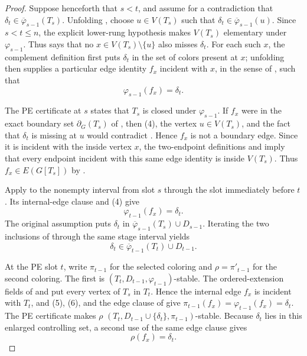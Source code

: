 \begin{proof}
Suppose henceforth that \(s<t\), and assume for a contradiction that
\(\delta_t\in\overline\varphi_{s-1}(T_s)\).  Unfolding
, choose \(u\in V(T_s)\) such that
\(\delta_t\in\overline\varphi_{s-1}(u)\).  Since \(s<t\leq n\), the
explicit lower-rung hypothesis makes \(V(T_s)\) elementary under
\(\varphi_{s-1}\).  Thus  says that
no \(x\in V(T_s)\setminus\{u\}\) also misses \(\delta_t\).  For each
such \(x\), the complement definition  first puts
\(\delta_t\) in the set of colors present at \(x\); unfolding
 then supplies a particular edge identity \(f_x\)
incident with \(x\), in the sense of , such that
\[
                        \varphi_{s-1}(f_x)=\delta_t.             \tag{4}
\]

The PE certificate at \(s\) states that \(T_s\) is closed under
\(\varphi_{s-1}\).  If \(f_x\) were in the exact boundary set
\(\partial_G(T_s)\) of , then (4), the vertex
\(u\in V(T_s)\), and the fact that \(\delta_t\) is missing at \(u\)
would contradict .  Hence \(f_x\) is not
a boundary edge.  Since it is incident with the inside vertex \(x\), the
two-endpoint definitions  and 
imply that every endpoint incident with this
same edge identity is inside \(V(T_s)\).  Thus
\(f_x\in E(G[T_s])\) by .

Apply  to the nonempty interval from
slot \(s\) through the slot immediately before \(t\).  Its internal-edge
clause and (4) give
\[
                        \varphi_{t-1}(f_x)=\delta_t.             \tag{5}
\]
The original assumption puts \(\delta_t\) in
\(\overline\varphi_{s-1}(T_s)\cup D_{s-1}\).  Iterating the two
inclusions of  through the same stage
interval yields
\[
       \delta_t\in\overline\varphi_{t-1}(T_t)\cup D_{t-1}.      \tag{6}
\]

At the PE slot \(t\), write \(\pi_{t-1}\) for the selected coloring and
\(\rho=\pi'_{t-1}\) for the second coloring.  The first is
\((T_t,D_{t-1},\varphi_{t-1})\)-stable.  The ordered-extension fields
of  and
 put every vertex of \(T_s\) in
\(T_t\).  Hence the internal edge \(f_x\) is incident with \(T_t\), and
(5), (6), and the edge clause of
 give
\(\pi_{t-1}(f_x)=\varphi_{t-1}(f_x)=\delta_t\).  The PE certificate
makes \(\rho\)
\((T_t,D_{t-1}\cup\{\delta_t\},\pi_{t-1})\)-stable.  Because
\(\delta_t\) lies in this enlarged controlling set, a second use of the
same edge clause gives
\[
                              \rho(f_x)=\delta_t.                \tag{7}
\]


\end{proof}

